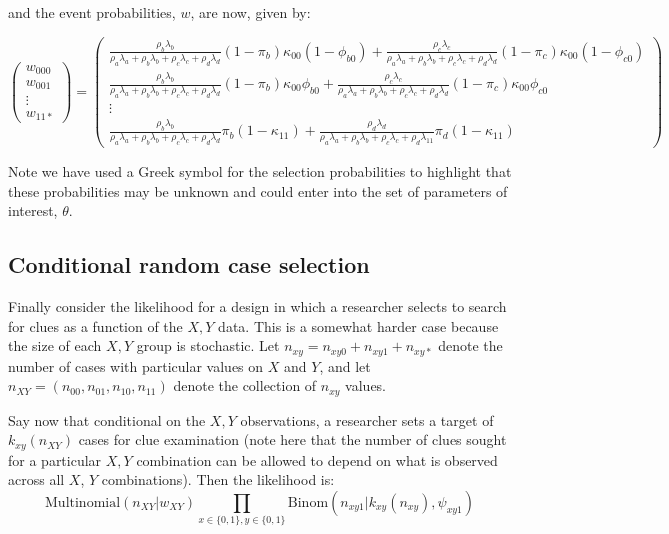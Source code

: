 \documentclass[12pt,]{book}
\begin{document}
and the event probabilities, \(w\), are now, given by:

\[\left( \begin{array}{c}
w_{000} \\ w_{001} \\  \vdots \\ w_{11*}
\end{array} \right)=
\left( \begin{array}{c}
\frac{\rho_b \lambda_b}{\rho_a \lambda_a+\rho_b \lambda_b+\rho_c \lambda_c+\rho_d \lambda_d}(1-\pi_b)\kappa_{00}(1-\phi_{b0}) +
\frac{\rho_c \lambda_c}{\rho_a \lambda_a+\rho_b \lambda_b+\rho_c \lambda_c+\rho_d \lambda_d}(1-\pi_c)\kappa_{00}(1-\phi_{c0})\\
\frac{\rho_b \lambda_b}{\rho_a \lambda_a+\rho_b \lambda_b+\rho_c \lambda_c+\rho_d \lambda_d}(1-\pi_b)\kappa_{00}\phi_{b0}+
\frac{\rho_c \lambda_c}{\rho_a \lambda_a+\rho_b \lambda_b+\rho_c \lambda_c+\rho_d \lambda_d}(1-\pi_c)\kappa_{00}\phi_{c0}\\
\vdots \\
\frac{\rho_b \lambda_b}{\rho_a \lambda_a+\rho_b \lambda_b+\rho_c \lambda_c+\rho_d \lambda_d}\pi_{b}(1-\kappa_{11})+
\frac{\rho_d \lambda_d}{\rho_a \lambda_a+\rho_b \lambda_b+\rho_c \lambda_c+\rho_d \lambda_{11}}\pi_{d}(1-\kappa_{11})
\end{array} \right)\]

Note we have used a Greek symbol for the selection probabilities to highlight that these probabilities may be unknown and could enter into the set of parameters of interest, \(\theta\).

\hypertarget{conditional-random-case-selection}{%
\subsection{Conditional random case selection}\label{conditional-random-case-selection}}

Finally consider the likelihood for a design in which a researcher selects to search for clues as a function of the \(X,Y\) data. This is a somewhat harder case because the size of each \(X,Y\) group is stochastic. Let \(n_{xy} = n_{xy0}+n_{xy1}+n_{xy*}\) denote the number of cases with particular values on \(X\) and \(Y\), and let \(n_{XY}=(n_{00},n_{01},n_{10},n_{11})\) denote the collection of \(n_{xy}\) values.

Say now that conditional on the \(X,Y\) observations, a researcher sets a target of \(k_{xy}(n_{XY})\) cases for clue examination (note here that the number of clues sought for a particular \(X,Y\) combination can be allowed to depend on what is observed across all \(X\), \(Y\) combinations). Then the likelihood is:
\[\text{Multinomial}(n_{XY}|w_{XY})\prod_{x\in\{0,1\},y \in\{0,1\}}\text{Binom}(n_{xy1}|k_{xy}(n_{xy}), \psi_{xy1})\]
\end{document}
